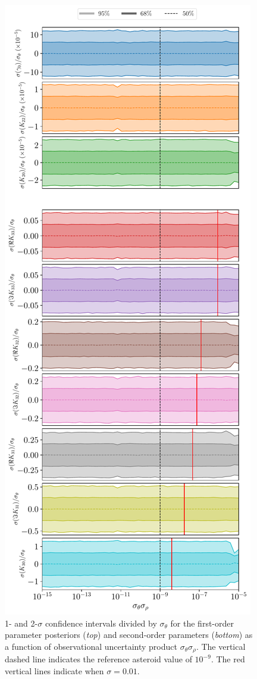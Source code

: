 \documentclass[fleqn,usenatbib]{mnras}
\begin{document}
\begin{figure}
  \centering
  \includegraphics[height=0.89\textheight]{figs/scan-product.pdf}
  \caption{1- and 2-$\sigma$ confidence intervals divided by $\sigma_\theta$ for the first-order parameter posteriors (\textit{top}) and second-order parameters (\textit{bottom}) as a function of observational uncertainty product $\sigma_\theta \sigma_\rho$. The vertical dashed line indicates the reference asteroid value of $10^{-9}$. The red vertical lines indicate when $\sigma =0.01$.}
  \label{fig:scan-product}
\end{figure}
\end{document}
